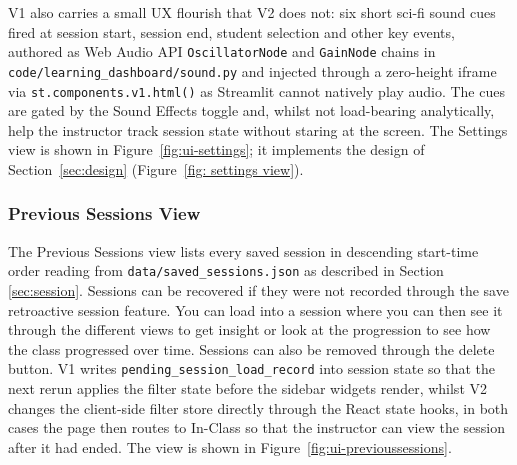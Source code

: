 V1 also carries a small UX flourish that V2 does not: six short sci-fi sound cues fired at session start, session end, student selection and other key events, authored as Web Audio API \texttt{OscillatorNode} and \texttt{GainNode} chains in \texttt{code/learning\_dashboard/sound.py} and injected through a zero-height iframe via \texttt{st.components.v1.html()} as Streamlit cannot natively play audio. The cues are gated by the Sound Effects toggle and, whilst not load-bearing analytically, help the instructor track session state without staring at the screen. The Settings view is shown in Figure~\ref{fig:ui-settings}; it implements the design of Section~\ref{sec:design} (Figure~\ref{fig: settings view}).




\subsubsection{Previous Sessions View}

The Previous Sessions view lists every saved session in descending start-time order reading from \texttt{data/saved\_sessions.json} as described in Section \ref{sec:session}. 
Sessions can be recovered if they were not recorded through the save retroactive session feature. 
You can load into a session where you can then see it through the different views to get insight or look at the progression to see how the class progressed over time. Sessions can also be removed through the delete button. 
V1 writes \texttt{pending\_session\_load\_record} into session state so that the next rerun applies the filter state before the sidebar widgets render, whilst V2 changes the client-side filter store directly through the React state hooks, in both cases the page then routes to In-Class so that the instructor can view the session after it had ended. The view is shown in Figure~\ref{fig:ui-previoussessions}.

